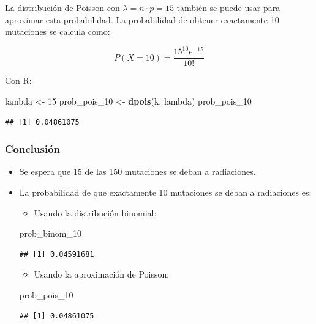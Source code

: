 \documentclass[
]{article}
\newenvironment{Shaded}{\begin{snugshade}}{\end{snugshade}}
\newcommand{\DecValTok}[1]{\textcolor[rgb]{0.00,0.00,0.81}{#1}}
\newcommand{\FunctionTok}[1]{\textcolor[rgb]{0.13,0.29,0.53}{\textbf{#1}}}
\newcommand{\NormalTok}[1]{#1}
\newcommand{\OtherTok}[1]{\textcolor[rgb]{0.56,0.35,0.01}{#1}}
\providecommand{\tightlist}{%
  \setlength{\itemsep}{0pt}\setlength{\parskip}{0pt}}
\begin{document}
La distribución de Poisson con \(\lambda = n \cdot p = 15\) también se puede usar para aproximar esta probabilidad. La probabilidad de obtener exactamente 10 mutaciones se calcula como:

\[ P(X = 10) = \frac{15^{10} e^{-15}}{10!} \]

Con R:

\begin{Shaded}
\begin{Highlighting}[]
\NormalTok{lambda }\OtherTok{\textless{}{-}} \DecValTok{15}
\NormalTok{prob\_pois\_10 }\OtherTok{\textless{}{-}} \FunctionTok{dpois}\NormalTok{(k, lambda)}
\NormalTok{prob\_pois\_10}
\end{Highlighting}
\end{Shaded}

\begin{verbatim}
## [1] 0.04861075
\end{verbatim}

\subsubsection{Conclusión}\label{conclusiuxf3n-1}

\begin{itemize}
\item
  Se espera que 15 de las 150 mutaciones se deban a radiaciones.
\item
  La probabilidad de que exactamente 10 mutaciones se deban a radiaciones es:

  \begin{itemize}
  \tightlist
  \item
    Usando la distribución binomial:
  \end{itemize}

\begin{Shaded}
\begin{Highlighting}[]
\NormalTok{prob\_binom\_10}
\end{Highlighting}
\end{Shaded}

\begin{verbatim}
## [1] 0.04591681
\end{verbatim}

  \begin{itemize}
  \tightlist
  \item
    Usando la aproximación de Poisson:
  \end{itemize}

\begin{Shaded}
\begin{Highlighting}[]
\NormalTok{prob\_pois\_10}
\end{Highlighting}
\end{Shaded}

\begin{verbatim}
## [1] 0.04861075
\end{verbatim}
\end{itemize}
\end{document}
